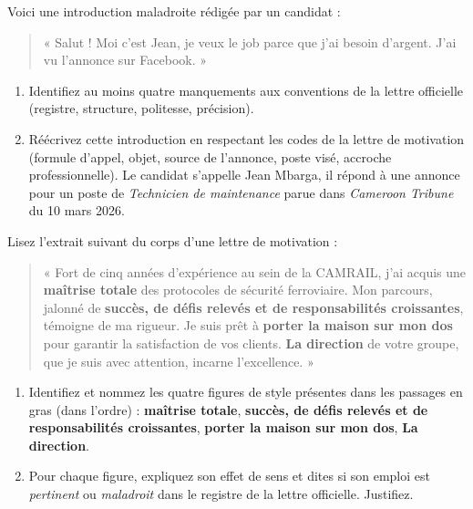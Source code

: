 \documentclass[11pt]{article}
\begin{document}
\begin{exercice}
Voici une introduction maladroite rédigée par un candidat :
\begin{quote}
« Salut ! Moi c'est Jean, je veux le job parce que j'ai besoin d'argent. J'ai vu l'annonce sur Facebook. »
\end{quote}
\begin{enumerate}
    \item Identifiez au moins quatre manquements aux conventions de la lettre officielle (registre, structure, politesse, précision).
    \item Réécrivez cette introduction en respectant les codes de la lettre de motivation (formule d'appel, objet, source de l'annonce, poste visé, accroche professionnelle). Le candidat s'appelle Jean Mbarga, il répond à une annonce pour un poste de \emph{Technicien de maintenance} parue dans \emph{Cameroon Tribune} du 10 mars 2026.
\end{enumerate}
\end{exercice}

\begin{exercice}
Lisez l'extrait suivant du corps d'une lettre de motivation :
\begin{quote}
« Fort de cinq années d'expérience au sein de la CAMRAIL, j'ai acquis une \textbf{maîtrise totale} des protocoles de sécurité ferroviaire. Mon parcours, jalonné de \textbf{succès, de défis relevés et de responsabilités croissantes}, témoigne de ma rigueur. Je suis prêt à \textbf{porter la maison sur mon dos} pour garantir la satisfaction de vos clients. \textbf{La direction} de votre groupe, que je suis avec attention, incarne l'excellence. »
\end{quote}
\begin{enumerate}
    \item Identifiez et nommez les quatre figures de style présentes dans les passages en gras (dans l'ordre) : \textbf{maîtrise totale}, \textbf{succès, de défis relevés et de responsabilités croissantes}, \textbf{porter la maison sur mon dos}, \textbf{La direction}.
    \item Pour chaque figure, expliquez son effet de sens et dites si son emploi est \emph{pertinent} ou \emph{maladroit} dans le registre de la lettre officielle. Justifiez.
\end{enumerate}
\end{exercice}
\end{document}

